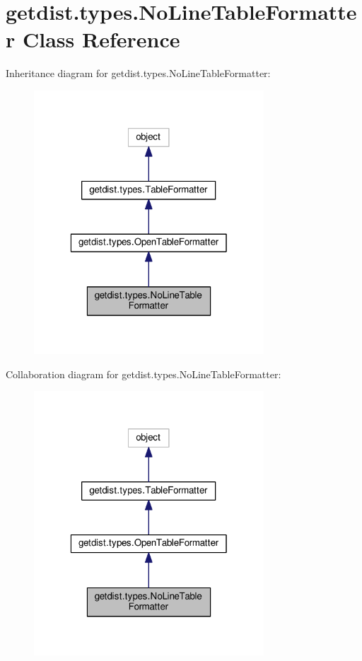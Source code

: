 \hypertarget{classgetdist_1_1types_1_1NoLineTableFormatter}{}\section{getdist.\+types.\+No\+Line\+Table\+Formatter Class Reference}
\label{classgetdist_1_1types_1_1NoLineTableFormatter}


Inheritance diagram for getdist.\+types.\+No\+Line\+Table\+Formatter\+:
\nopagebreak
\begin{figure}[H]
\begin{center}
\leavevmode
\includegraphics[width=244pt]{classgetdist_1_1types_1_1NoLineTableFormatter__inherit__graph}
\end{center}
\end{figure}


Collaboration diagram for getdist.\+types.\+No\+Line\+Table\+Formatter\+:
\nopagebreak
\begin{figure}[H]
\begin{center}
\leavevmode
\includegraphics[width=244pt]{classgetdist_1_1types_1_1NoLineTableFormatter__coll__graph}
\end{center}
\end{figure}
